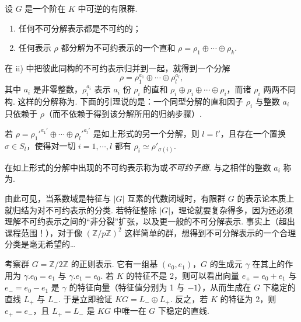 \begin{corollary}\label{cor:fg-4-1-12}
设 $G$ 是一个阶在 $K$ 中可逆的有限群.
\begin{enumerate}[label=\roman*)]
\item 任何不可分解表示都是不可约的；
\item 任何表示 $\rho$ 都分解为不可约表示的一个直和 $\rho=\rho_1\oplus\cdots\oplus\rho_k$.
\end{enumerate}
\end{corollary}

在 ii) 中把彼此同构的不可约表示归并到一起，就得到一个分解
\[
\rho=\rho_1^{a_1}\oplus\cdots\oplus\rho_l^{a_l},
\]
其中 $a_i$ 是非零整数，$\rho_i^{a_i}$ 表示 $a_i$ 份 $\rho_i$ 的直和 $\rho_i\oplus\rho_i\oplus\cdots\oplus\rho_i$，而诸 $\rho_i$ 两两不同构. 这样的分解称为. 下面的引理说的是：一个同型分解的直和因子 $\rho_i$ 与整数 $a_i$ 只依赖于 $\rho$（而不依赖于得到该分解所用的归纳步骤）.

\begin{lemma}\label{lemma:fg-4-1-13}
若 $\rho=\rho_1'^{a_1'}\oplus\cdots\oplus\rho_l'^{a_l'}$ 是如上形式的另一个分解，则 $l=l'$，且存在一个置换 $\sigma\in S_l$，使得对一切 $i=1,\cdots,l$ 都有 $\rho_i\simeq\rho'_{\sigma(i)}$.
\end{lemma}

\begin{definition}\label{def:fg-4-1-14}
在如上形式的分解中出现的不可约表示称为或\emph{不可约子商}. 与之相伴的整数 $a_i$ 称为.
\end{definition}

由此可见，当系数域是特征与 $|G|$ 互素的代数闭域时，有限群 $G$ 的表示论本质上就归结为对不可约表示的分类. 若特征整除 $|G|$，理论就要复杂得多，因为还必须理解不可约表示之间的``非分裂''扩张，以及更一般的不可分解表示. 事实上（超出课程范围！），对于像 $(\mathbb{Z}/p\mathbb{Z})^2$ 这样简单的群，想得到不可分解表示的一个合理分类是毫无希望的\ldots

\begin{example}\label{ex:fg-4-1-15}
考察群 $G=\mathbb{Z}/2\mathbb{Z}$ 的正则表示. 它有一组基 $(e_0,e_1)$，$G$ 的生成元 $\gamma$ 在其上的作用为 $\gamma.e_0=e_1$ 与 $\gamma.e_1=e_0$. 若 $K$ 的特征不是 2，则可以看出向量 $e_+=e_0+e_1$ 与 $e_-=e_0-e_1$ 是 $\gamma$ 的特征向量（特征值分别为 1 与 $-1$），从而生成在 $G$ 下稳定的直线 $L_+$ 与 $L_-$. 于是立即验证 $KG=L_-\oplus L_+$. 反之，若 $K$ 的特征为 2，则 $e_+=e_-$，且 $L_+=L_-$ 是 $KG$ 中唯一在 $G$ 下稳定的直线.
\end{example}

